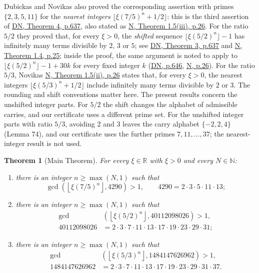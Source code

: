 \documentclass[11pt,reqno]{amsart}
\newtheorem{theorem}{Theorem}
\theoremstyle{definition}
\theoremstyle{remark}
\begin{document}
Dubickas and Novikas also proved the
corresponding assertion with primes \(\{2,3,5,11\}\) for the \emph{nearest
integers}
\(\lfloor\xi(7/5)^n+1/2\rfloor\): this is the third assertion of
\hyperref[ref-dn]{DN, Theorem 4, p.637}, also stated as
\hyperref[ref-n]{N, Theorem 1.5(iii), p.26}. For the ratio \(5/2\) they proved
that, for every \(\xi>0\), the \emph{shifted} sequence
\(\lfloor\xi(5/2)^n\rfloor-1\) has infinitely many terms divisible by
\(2\), \(3\) or \(5\); see \hyperref[ref-dn]{DN, Theorem 3, p.637} and
\hyperref[ref-n]{N, Theorem 1.4, p.25}; inside the proof, the same argument is
noted to apply to \(\lfloor\xi(5/2)^n\rfloor-1+30k\) for every fixed
integer \(k\) (\hyperref[ref-dn]{DN, p.646}, \hyperref[ref-n]{N, p.26}).
For the ratio \(5/3\), Novikas \hyperref[ref-n]{N, Theorem 1.5(ii), p.26}
states that, for every \(\xi>0\), the nearest integers
\(\lfloor\xi(5/3)^n+1/2\rfloor\) include infinitely many terms divisible
by \(2\) or \(3\).
The rounding and shift conventions matter here. The present results
concern the unshifted integer parts. For \(5/2\) the shift changes the
alphabet of admissible carries, and our certificate uses a different
prime set. For the unshifted integer parts with ratio \(5/3\), avoiding
\(2\) and \(3\) leaves the carry alphabet \(\{-2,2,4\}\) (Lemma 74), and
our certificate uses the further primes \(7,11,\ldots,37\); the
nearest-integer result is not used.

\begin{samepage}
\begin{theorem}[Main Theorem]\leavevmode\label{thm:1}
For every \(\xi\in\mathbb R\) with
\(\xi>0\) and every \(N\in\mathbb N\):

\begin{enumerate}
\def\labelenumi{(\roman{enumi})}
\item
  there is an integer \(n\ge\max(N,1)\) such that
  \[
  \gcd\!\left(\left\lfloor\xi(7/5)^n\right\rfloor,4290\right)>1,
  \qquad 4290=2\cdot3\cdot5\cdot11\cdot13;
  \tag{1}\label{eq:1}
  \]
\item
  there is an integer \(n\ge\max(N,1)\) such that
  \[
  \begin{aligned}
  \gcd\!&\left(\left\lfloor\xi(5/2)^n\right\rfloor,40112098026\right)>1,\\
  40112098026&=2\cdot3\cdot7\cdot11\cdot13\cdot17\cdot19\cdot23\cdot29\cdot31;
  \end{aligned}
  \tag{2}\label{eq:2}
  \]
\item
  there is an integer \(n\ge\max(N,1)\) such that
  \[
  \begin{aligned}
  \gcd\!&\left(\left\lfloor\xi(5/3)^n\right\rfloor,1484147626962\right)>1,\\
  1484147626962&=2\cdot3\cdot7\cdot11\cdot13\cdot17\cdot19\cdot23\cdot29\cdot31\cdot37.
  \end{aligned}
  \tag{2a}\label{eq:2a}
  \]
\end{enumerate}
\label{thm-end:1}
\end{theorem}
\end{samepage}
\end{document}
